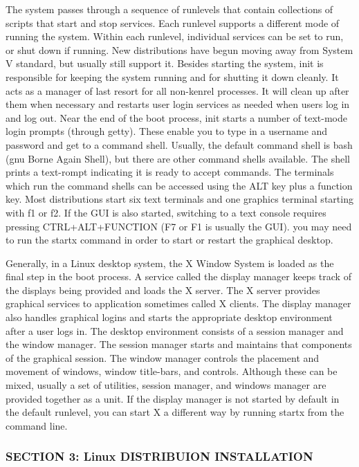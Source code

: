 The system passes through a sequence of runlevels that contain
collections of scripts that start and stop services. Each runlevel
supports a different mode of running the system. Within each runlevel,
individual services can be set to run, or shut down if running. New
distributions have begun moving away from System V standard, but usually
still support it. Besides starting the system, init is responsible for
keeping the system running and for shutting it down cleanly. It acts as
a manager of last resort for all non-kenrel processes. It will clean up
after them when necessary and restarts user login services as needed
when users log in and log out. Near the end of the boot process, init
starts a number of text-mode login prompts (through getty). These enable
you to type in a username and password and get to a command shell.
Usually, the default command shell is bash (gnu Borne Again Shell), but
there are other command shells available. The shell prints a text-rompt
indicating it is ready to accept commands. The terminals which run the
command shells can be accessed using the ALT key plus a function key.
Most distributions start six text terminals and one graphics terminal
starting with f1 or f2. If the GUI is also started, switching to a text
console requires pressing CTRL+ALT+FUNCTION (F7 or F1 is usually the
GUI). you may need to run the startx command in order to start or
restart the graphical desktop.

Generally, in a Linux desktop system, the X Window System is loaded as
the final step in the boot process. A service called the display manager
keeps track of the displays being provided and loads the X server. The X
server provides graphical services to application sometimes called X
clients. The display manager also handles graphical logins and starts
the appropriate desktop environment after a user logs in. The desktop
environment consists of a session manager and the window manager. The
session manager starts and maintains that components of the graphical
session. The window manager controls the placement and movement of
windows, window title-bars, and controls. Although these can be mixed,
usually a set of utilities, session manager, and windows manager are
provided together as a unit. If the display manager is not started by
default in the default runlevel, you can start X a different way by
running startx from the command line.

\subsubsection{SECTION 3: Linux DISTRIBUION
INSTALLATION}\label{section-3-linux-distribuion-installation}

